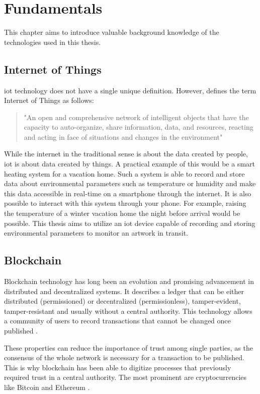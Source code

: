 \chapter{Fundamentals} %
\label{chap:technologies}
This chapter aims to introduce valuable background knowledge of the technologies used in this thesis.

\section{Internet of Things}
\gls{iot} technology does not have a single unique definition. However, \textcite{iot} defines the term Internet of Things as follows: %
\begin{quote}
    "An open and comprehensive network of intelligent objects that have the capacity to auto-organize, share information, data, and resources, reacting and acting in face of situations and changes in the environment"
\end{quote}
While the internet in the traditional sense is about the data created by people, \gls{iot} is about data created by things. A practical example of this would be a smart heating system for a vacation home. Such a system is able to record and store data about environmental parameters such as temperature or humidity and make this data accessible in real-time on a smartphone through the internet. It is also possible to interact with this system through your phone. For example, raising the temperature of a winter vacation home the night before arrival would be possible. This thesis aims to utilize an \gls{iot} device capable of recording and storing environmental parameters to monitor an artwork in transit.

\section{Blockchain}
Blockchain technology has long been an evolution and promising advancement in distributed and decentralized systems. It describes a ledger that can be either distributed (permissioned) or decentralized (permissionless), tamper-evident, tamper-resistant and usually without a central authority. This technology allows a community of users to record transactions that cannot be changed once published \parencite{blockchainoverview}.

These properties can reduce the importance of trust among single parties, as the consensus of the whole network is necessary for a transaction to be published. This is why blockchain has been able to digitize processes that previously required trust in a central authority. The most prominent are cryptocurrencies like Bitcoin and Ethereum \cite{bitcoin, ethereum}.

